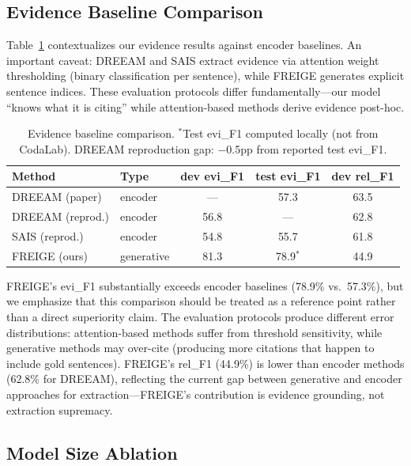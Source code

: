 \documentclass[11pt,a4paper]{article}
\newcommand{\method}{FREIGE}
\begin{document}
\subsection{Evidence Baseline Comparison}
\label{sec:protocol}

Table~\ref{tab:baseline} contextualizes our evidence results against encoder baselines. An important caveat: DREEAM and SAIS extract evidence via attention weight thresholding (binary classification per sentence), while \method{} generates explicit sentence indices. These evaluation protocols differ fundamentally---our model ``knows what it is citing'' while attention-based methods derive evidence post-hoc.

\begin{table}[t]
\centering
\small
\begin{tabular}{llccc}
\toprule
\textbf{Method} & \textbf{Type} & \textbf{dev evi\_F1} & \textbf{test evi\_F1} & \textbf{dev rel\_F1} \\
\midrule
DREEAM (paper) & encoder & --- & 57.3 & 63.5 \\
DREEAM (reprod.) & encoder & 56.8 & --- & 62.8 \\
SAIS (reprod.) & encoder & 54.8 & 55.7 & 61.8 \\
FREIGE (ours) & generative & 81.3 & 78.9$^*$ & 44.9 \\
\bottomrule
\end{tabular}
\caption{Evidence baseline comparison. $^*$Test evi\_F1 computed locally (not from CodaLab). DREEAM reproduction gap: $-$0.5pp from reported test evi\_F1.}
\label{tab:baseline}
\end{table}

\method{}'s evi\_F1 substantially exceeds encoder baselines (78.9\% vs.\ 57.3\%), but we emphasize that this comparison should be treated as a reference point rather than a direct superiority claim. The evaluation protocols produce different error distributions: attention-based methods suffer from threshold sensitivity, while generative methods may over-cite (producing more citations that happen to include gold sentences). \method{}'s rel\_F1 (44.9\%) is lower than encoder methods (62.8\% for DREEAM), reflecting the current gap between generative and encoder approaches for extraction---\method{}'s contribution is evidence grounding, not extraction supremacy.

\subsection{Model Size Ablation}
\end{document}
